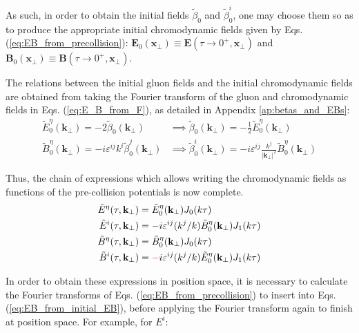 As such, in order to obtain the initial fields $\tilde{\beta}_0$ and $\tilde{\beta}_0^i$, one may choose them so as to produce the appropriate initial chromodynamic fields given by Eqs. (\ref{eq:EB_from_precollision}): $\mathbf{E}_0 (\mathbf{x}_\perp) \equiv \mathbf{E}(\tau \to 0^+,\mathbf{x}_\perp)$ and \linebreak $\mathbf{B}_0 (\mathbf{x}_\perp) \equiv \mathbf{B}(\tau \to 0^+,\mathbf{x}_\perp)$.

The relations between the initial gluon fields and the initial chromodynamic fields are obtained from taking the Fourier transform of the gluon and chromodynamic fields in Eqs. (\ref{eq:E_B_from_F}), as detailed in Appendix \ref{ap:betas_and_EBs}:
\begin{subequations}
\begin{align}
\label{eq:betas_and_E}
\tilde{E}_0^\eta (\mathbf{k}_\perp) = -2 \tilde{\beta}_0 (\mathbf{k}_\perp) & \implies \tilde{\beta}_0 (\mathbf{k}_\perp) = -\frac12 \tilde{E}_0^\eta (\mathbf{k}_\perp)\\ 
\label{eq:betas_and_B}
\tilde{B}_0^\eta (\mathbf{k}_\perp) = - i \varepsilon^{ij} k^i \tilde{\beta}_0^j (\mathbf{k}_\perp) & \implies \tilde{\beta}^i_0 (\mathbf{k}_\perp)= - i \varepsilon^{ij} \frac{k^j}{|\mathbf{k}_\perp|^2} \tilde{B}_0^\eta(\mathbf{k}_\perp) 
\end{align}
\label{eq:betas_and_EBs}
\end{subequations}

Thus, the chain of expressions which allows writing the chromodynamic fields as functions of the pre-collision potentials is now complete.
\begin{subequations} \label{eq:EB_from_initial_EB}
\begin{align}
\tilde{E}^\eta(\tau,\mathbf{k}_\perp) & = \tilde{E}^\eta_0 (\mathbf{k}_\perp) J_0 (k \tau) \\
\tilde{E}^i(\tau,\mathbf{k}_\perp) & = -i \varepsilon^{ij} (k^j/k) \tilde{B}_0^\eta (\mathbf{k}_\perp) J_1 (k \tau) \\
\tilde{B}^\eta(\tau,\mathbf{k}_\perp) & = \tilde{B}^\eta_0 (\mathbf{k}_\perp) J_0 (k \tau) \\
\tilde{B}^i(\tau,\mathbf{k}_\perp) & = \textcolor{red}{-}i \varepsilon^{ij} (k^j/k) \tilde{E}_0^\eta (\mathbf{k}_\perp) J_1 (k \tau)
\end{align}
\end{subequations}

In order to obtain these expressions in position space, it is necessary to calculate the Fourier transforms of Eqs. (\ref{eq:EB_from_precollision}) to insert into Eqs. (\ref{eq:EB_from_initial_EB}), before applying the Fourier transform again to finish at position space. For example, for $E^i$:

